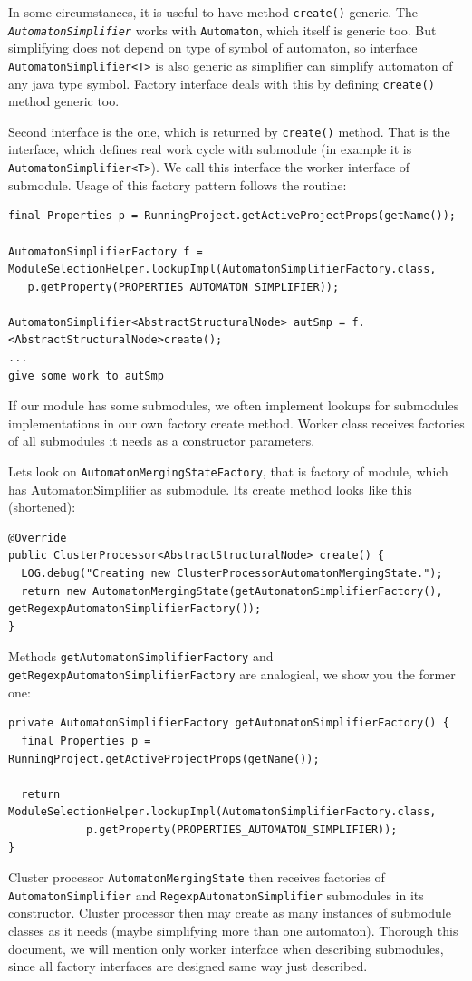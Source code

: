 \documentclass[a4paper,10pt,oneside]{article}
\newcommand{\code}[1]{\texttt{#1}}
\newcommand{\jmodule}[1]{\texttt{\textit{#1}}}
\begin{document}
In some circumstances, it is useful to have method \code{create()} generic.
The \jmodule{AutomatonSimplifier} works with \code{Automaton}, which itself is generic too.
But simplifying does not depend on type of symbol of automaton, so interface \code{AutomatonSimplifier<T>}
is also generic as simplifier can simplify automaton of any java type symbol.
Factory interface deals with this by defining \code{create()} method generic too.

Second interface is the one, which is returned by \code{create()} method.
That is the interface, which defines real work cycle with submodule (in example it is \code{AutomatonSimplifier<T>}).
We call this interface the worker interface of submodule.
Usage of this factory pattern follows the routine:
\begin{verbatim}
final Properties p = RunningProject.getActiveProjectProps(getName());

AutomatonSimplifierFactory f = ModuleSelectionHelper.lookupImpl(AutomatonSimplifierFactory.class,
   p.getProperty(PROPERTIES_AUTOMATON_SIMPLIFIER));

AutomatonSimplifier<AbstractStructuralNode> autSmp = f.<AbstractStructuralNode>create();
...
give some work to autSmp
\end{verbatim}
If our module has some submodules, we often implement lookups for submodules implementations in our own factory create method.
Worker class receives factories of all submodules it needs as a constructor parameters.

Lets look on \code{AutomatonMergingStateFactory}, that is factory of module, which has AutomatonSimplifier as submodule.
Its create method looks like this (shortened): 
\begin{verbatim}
@Override
public ClusterProcessor<AbstractStructuralNode> create() {
  LOG.debug("Creating new ClusterProcessorAutomatonMergingState.");
  return new AutomatonMergingState(getAutomatonSimplifierFactory(), getRegexpAutomatonSimplifierFactory());
}
\end{verbatim}
Methods \code{getAutomatonSimplifierFactory} and \code{getRegexpAutomatonSimplifierFactory} are analogical, we show you the former one:
\begin{verbatim}
private AutomatonSimplifierFactory getAutomatonSimplifierFactory() {
  final Properties p = RunningProject.getActiveProjectProps(getName());

  return ModuleSelectionHelper.lookupImpl(AutomatonSimplifierFactory.class,
            p.getProperty(PROPERTIES_AUTOMATON_SIMPLIFIER));
}
\end{verbatim}
Cluster processor \code{AutomatonMergingState} then receives factories of \code{AutomatonSimplifier} and \code{RegexpAutomatonSimplifier} submodules in its constructor.
Cluster processor then may create as many instances of submodule classes as it needs (maybe simplifying more than one automaton).
Thorough this document, we will mention only worker interface when describing submodules, since all factory interfaces are designed same way just described.
\end{document}
